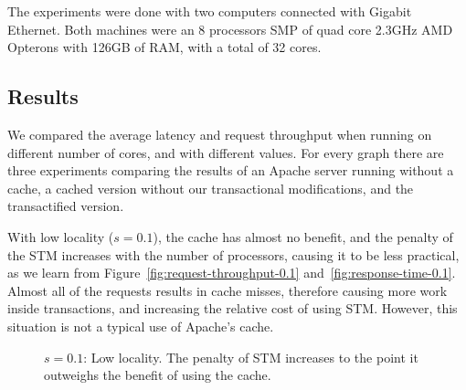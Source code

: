 \documentclass[preprint,11pt]{sigplanconf}
\begin{document}
The experiments were done with two computers connected with Gigabit Ethernet.
Both machines were an 8 processors SMP of quad core 2.3GHz AMD Opterons 
with 126GB of RAM, with a total of 32 cores. 

\subsection{Results} 
We compared the average latency and request throughput when running on different
number of cores, and with different  values. For every graph there are three
experiments comparing the results of an Apache server running without a cache, a
cached version without our transactional modifications, and the transactified
version. 

With low locality ($s=0.1$), the cache has almost no benefit, and the penalty of
the STM increases with the number of processors, causing it to be less
practical, as we learn from Figure~\ref{fig:request-throughput-0.1}
and~\ref{fig:response-time-0.1}. Almost all of the requests results in cache
misses, therefore causing more work inside transactions, and increasing the
relative cost of using STM. However, this situation is not a typical use of
Apache's cache.

\begin{figure}
 \centering
 \hfill
 \caption{$s = 0.1$: Low locality. The penalty of STM increases to the point it
    outweighs the benefit of using the cache.}
\end{figure}
\end{document}
